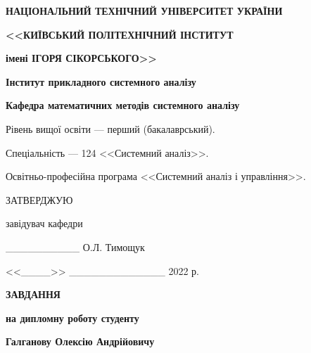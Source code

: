 \thispagestyle{empty}
\begin{center}
    {
        \textbf{НАЦІОНАЛЬНИЙ ТЕХНІЧНИЙ УНІВЕРСИТЕТ УКРАЇНИ}

        \textbf{<<КИЇВСЬКИЙ ПОЛІТЕХНІЧНИЙ ІНСТИТУТ}
        
        \textbf{імені ІГОРЯ СІКОРСЬКОГО>>}
        
        \textbf{Інститут прикладного системного аналізу}
        
        \textbf{Кафедра математичних методів системного аналізу}

    }
\end{center}

Рівень вищої освіти --- перший (бакалаврський).

Спеціальність --- 124 <<Системний аналіз>>.

Освітньо-професійна програма <<Системний аналіз і управління>>.

\begin{flushright}
    {
        ЗАТВЕРДЖУЮ

        завідувач кафедри

        \_\_\_\_\_\_\_\_\_\_ О.Л. Тимощук

        <<\_\_\_\_>> \_\_\_\_\_\_\_\_\_\_\_\_\_ 2022 р.
    
    }
\end{flushright}

\begin{center}
    {
        \textbf{ЗАВДАННЯ}

        \textbf{на дипломну роботу студенту}
        
        \textbf{Галганову Олексію Андрійовичу}

    }
\end{center}

